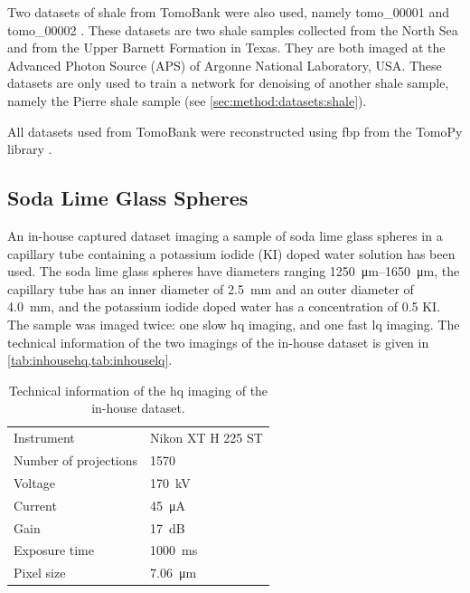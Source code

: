 Two datasets of shale from TomoBank were also used, namely tomo\_00001 and tomo\_00002 \cite{datasetshale}. These datasets are two shale samples collected from the North Sea and from the Upper Barnett Formation in Texas. They are both imaged at the Advanced Photon Source (APS) of Argonne National Laboratory, USA. These datasets are only used to train a network for denoising of another shale sample, namely the Pierre shale sample (see \cref{sec:method:datasets:shale}). 

All datasets used from TomoBank were reconstructed using \gls{fbp} from the TomoPy library \cite{tomopy}. 

\subsection{Soda Lime Glass Spheres}
\label{sec:method:datasets:inhouse}
An in-house captured dataset imaging a sample of soda lime glass spheres in a capillary tube containing a potassium iodide (KI) doped water solution has been used. The soda lime glass spheres have diameters ranging \SIrange{1250}{1650}{\micro \meter}, the capillary tube has an inner diameter of \SI{2.5}{\milli \meter} and an outer diameter of \SI{4.0}{\milli \meter}, and the potassium iodide doped water has a concentration of \SI{0.5}{\molar} KI. The sample was imaged twice: one slow \acrlong{hq} imaging, and one fast \acrlong{lq} imaging. The technical information of the two imagings of the in-house dataset is given in \cref{tab:inhousehq,tab:inhouselq}.

\begin{table}[htbp]
    \centering
    \caption[Technical information of the IHHQ soda lime glass spheres dataset]{Technical information of the \acrlong{hq} imaging of the in-house dataset. }
    \label{tab:inhousehq}
    \begin{tabular}{ll}
    \hline
    Instrument & Nikon XT H 225 ST \\
    Number of projections & 1570 \\
    Voltage & \SI{170}{\kilo \volt}\\
    Current & \SI{45}{\micro \ampere}\\
    Gain & \SI{17}{\deci \bel}\\
    Exposure time & \SI{1000}{\milli \second}\\
    Pixel size & \SI{7.06}{\micro \meter} \\
    \hline
    \end{tabular}
\end{table}

